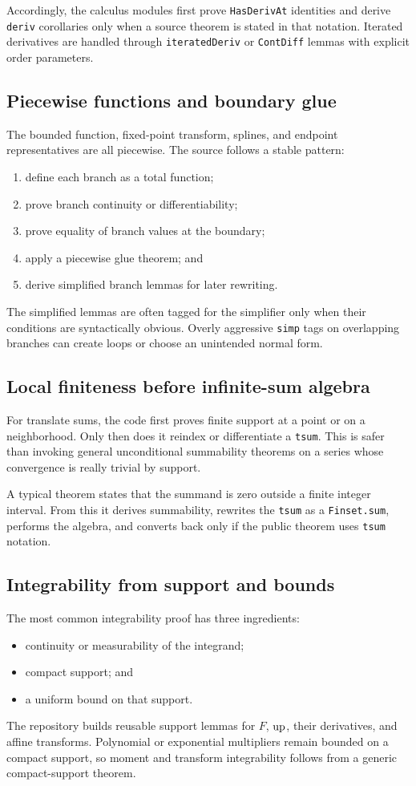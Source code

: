 \documentclass[11pt,oneside]{article}
\theoremstyle{definition}
\theoremstyle{remark}
\begin{document}
Accordingly, the calculus modules first prove \nolinkurl{HasDerivAt} identities and derive \nolinkurl{deriv} corollaries only when a source theorem is stated in that notation.  Iterated derivatives are handled through \nolinkurl{iteratedDeriv} or \nolinkurl{ContDiff} lemmas with explicit order parameters.

\subsection{Piecewise functions and boundary glue}
The bounded function, fixed-point transform, splines, and endpoint representatives are all piecewise.  The source follows a stable pattern:
\begin{enumerate}
  \item define each branch as a total function;
  \item prove branch continuity or differentiability;
  \item prove equality of branch values at the boundary;
  \item apply a piecewise glue theorem; and
  \item derive simplified branch lemmas for later rewriting.
\end{enumerate}
The simplified lemmas are often tagged for the simplifier only when their conditions are syntactically obvious.  Overly aggressive \nolinkurl{simp} tags on overlapping branches can create loops or choose an unintended normal form.

\subsection{Local finiteness before infinite-sum algebra}
For translate sums, the code first proves finite support at a point or on a neighborhood.  Only then does it reindex or differentiate a \nolinkurl{tsum}.  This is safer than invoking general unconditional summability theorems on a series whose convergence is really trivial by support.

A typical theorem states that the summand is zero outside a finite integer interval.  From this it derives summability, rewrites the \nolinkurl{tsum} as a \nolinkurl{Finset.sum}, performs the algebra, and converts back only if the public theorem uses \nolinkurl{tsum} notation.

\subsection{Integrability from support and bounds}
The most common integrability proof has three ingredients:
\begin{itemize}
  \item continuity or measurability of the integrand;
  \item compact support; and
  \item a uniform bound on that support.
\end{itemize}
The repository builds reusable support lemmas for \(F\), \(\operatorname{up}\), their derivatives, and affine transforms.  Polynomial or exponential multipliers remain bounded on a compact support, so moment and transform integrability follows from a generic compact-support theorem.
\end{document}
